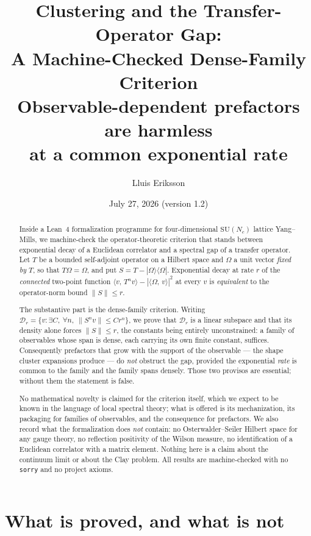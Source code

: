 \documentclass[11pt]{article}
\title{Clustering and the Transfer-Operator Gap:\\
A Machine-Checked Dense-Family Criterion\\
\large Observable-dependent prefactors are harmless\\
at a common exponential rate}
\author{Lluis Eriksson}
\date{July 27, 2026 (version 1.2)}
\theoremstyle{definition}
\newcommand{\lean}[1]{\texttt{#1}}
\newcommand{\SU}{\mathrm{SU}}
\newcommand{\Om}{\Omega}
\newcommand{\inn}[2]{\langle #1,\, #2\rangle}
\newcommand{\ket}[1]{|#1\rangle}
\newcommand{\bra}[1]{\langle #1|}
\begin{document}
\maketitle

\begin{abstract}
Inside a Lean~4 formalization programme for four-dimensional $\SU(N_c)$
lattice Yang--Mills, we machine-check the operator-theoretic criterion
that stands between exponential decay of a Euclidean correlator and a
spectral gap of a transfer operator.  Let $T$ be a bounded self-adjoint
operator on a Hilbert space and $\Om$ a unit vector \emph{fixed by} $T$,
so that $T\Om = \Om$, and put $S = T - \ket{\Om}\bra{\Om}$.  Exponential
decay at rate $r$ of the \emph{connected} two-point function
$\inn{v}{T^n v} - |\inn{\Om}{v}|^2$ at every $v$ is \emph{equivalent} to
the operator-norm bound $\|S\| \le r$.

The substantive part is the dense-family criterion.  Writing
$\mathcal{D}_r = \{v : \exists C,\ \forall n,\ \|S^n v\| \le C r^n\}$, we
prove that $\mathcal{D}_r$ is a linear subspace and that its density
alone forces $\|S\| \le r$, the constants being entirely unconstrained:
a family of observables whose span is dense, each carrying its own finite
constant, suffices.  Consequently prefactors that grow with the support
of the observable --- the shape cluster expansions produce --- do
\emph{not} obstruct the gap, provided the exponential \emph{rate} is
common to the family and the family spans densely.  Those two provisos
are essential; without them the statement is false.

No mathematical novelty is claimed for the criterion itself, which we
expect to be known in the language of local spectral theory; what is
offered is its mechanization, its packaging for families of observables,
and the consequence for prefactors.  We also record what the
formalization does \emph{not} contain: no Osterwalder--Seiler Hilbert
space for any gauge theory, no reflection positivity of the Wilson
measure, no identification of a Euclidean correlator with a matrix
element.  Nothing here is a claim about the continuum limit or about the
Clay problem.  All results are machine-checked with no \lean{sorry} and
no project axioms.
\end{abstract}

\section{What is proved, and what is not}
\end{document}
